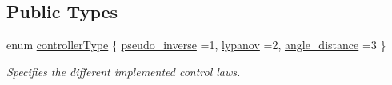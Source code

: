 \subsection*{Public Types}
\begin{DoxyCompactItemize}
\item 
enum \hyperlink{classController_a86221d052db839985bd6e4d73013cd06}{controller\+Type} \{ \hyperlink{classController_a86221d052db839985bd6e4d73013cd06ad2e9073ef821965020410686a3c89483}{pseudo\+\_\+inverse} =1, 
\hyperlink{classController_a86221d052db839985bd6e4d73013cd06aed0e850e561d54619d85f32c37f5bfab}{lypanov} =2, 
\hyperlink{classController_a86221d052db839985bd6e4d73013cd06a7ab0ee34114a951d4491d6eb73500cdc}{angle\+\_\+distance} =3
 \}\begin{DoxyCompactList}\small\item\em Specifies the different implemented control laws. \end{DoxyCompactList}
\end{DoxyCompactItemize}
